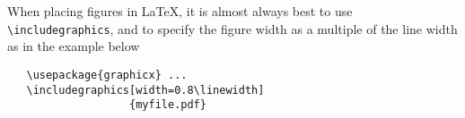 \documentclass[10pt,twocolumn,letterpaper]{article}
\begin{document}
When placing figures in \LaTeX, it is almost always best to use \verb+\includegraphics+, and to specify the  figure width as a multiple of the line width as in the example below
{\small\begin{verbatim}
   \usepackage{graphicx} ...
   \includegraphics[width=0.8\linewidth]
                   {myfile.pdf}
\end{verbatim}
}


{\small


}
\end{document}
